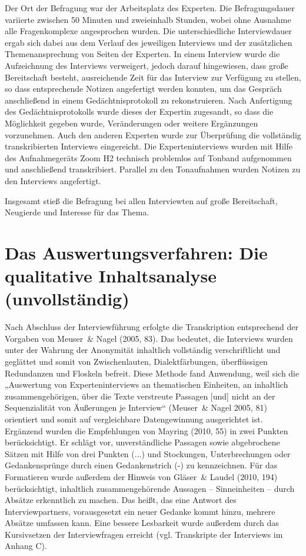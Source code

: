 Der Ort der Befragung war der Arbeitsplatz des Experten. Die Befragungsdauer variierte zwischen 50 Minuten und zweieinhalb Stunden, wobei ohne Ausnahme alle Fragenkomplexe angesprochen wurden. Die unterschiedliche Interviewdauer ergab sich dabei aus dem Verlauf des jeweiligen Interviews und der zusätzlichen Themenansprechung von Seiten der Experten. In einem Interview wurde die Aufzeichnung des Interviews verweigert, jedoch darauf hingewiesen, dass große Bereitschaft besteht, ausreichende Zeit für das Interview zur Verfügung zu stellen, so dass entsprechende Notizen angefertigt werden konnten, um das Gespräch anschließend in einem Gedächtnisprotokoll zu rekonstruieren. Nach Anfertigung des Gedächtnisprotokolls wurde dieses der Expertin zugesandt, so dass die Möglichkeit gegeben wurde, Veränderungen oder weitere Ergänzungen vorzunehmen. Auch den anderen Experten wurde zur Überprüfung die vollständig transkribierten Interviews eingereicht. 
Die Experteninterviews wurden mit Hilfe des Aufnahmegeräts Zoom H2 technisch problemlos auf Tonband aufgenommen und anschließend transkribiert. Parallel zu den Tonaufnahmen wurden Notizen zu den Interviews angefertigt. 

Insgesamt stieß die Befragung bei allen Interviewten auf große Bereitschaft, Neugierde und Interesse für das Thema.

\section{Das Auswertungsverfahren: Die qualitative Inhaltsanalyse (unvollständig)}

Nach Abschluss der Interviewführung erfolgte die Transkription entsprechend der Vorgaben von Meuser~\& Nagel (2005, 83). Das bedeutet, die Interviews wurden unter der Wahrung der Anonymität inhaltlich vollständig verschriftlicht und geglättet und somit von Zwischenlauten, Dialektfärbungen, überflüssigen Redundanzen und Floskeln befreit. Diese Methode fand Anwendung, weil sich die „Auswertung von Experteninterviews an thematischen Einheiten, an inhaltlich zusammengehörigen, über die Texte verstreute Passagen [und] nicht an der Sequenzialität von Äußerungen je Interview“ (Meuser~\& Nagel 2005, 81) orientiert und somit auf vergleichbare Datengewinnung ausgerichtet ist. 
Ergänzend wurden die Empfehlungen von Mayring (2010, 55) in zwei Punkten berücksichtigt. Er schlägt vor, unverständliche Passagen sowie abgebrochene Sätzen mit Hilfe von drei Punkten (...) und Stockungen, Unterbrechungen oder Gedankensprünge durch einen Gedankenstrich (-) zu kennzeichnen. 
Für das Formatieren wurde außerdem der Hinweis von Gläser~\& Laudel (2010, 194) berücksichtigt, inhaltlich zusammengehörende Aussagen -- Sinneinheiten -- durch Absätze erkenntlich zu machen. Das heißt, das eine Antwort des Interviewpartners, vorausgesetzt ein neuer Gedanke kommt hinzu, mehrere Absätze umfassen kann. Eine bessere Lesbarkeit wurde außerdem durch das Kursivsetzen der Interviewfragen erreicht (vgl. Transkripte der Interviews im Anhang C). 

